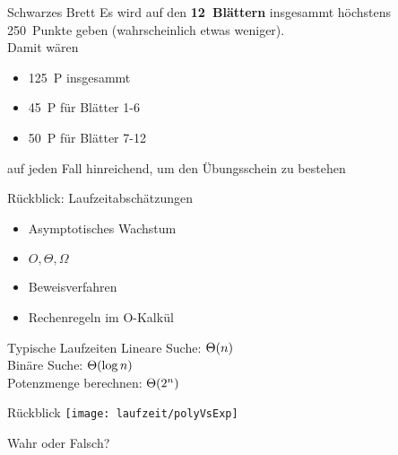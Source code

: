 {
	\begin{frame}{Schwarzes Brett}
     Es wird auf den \textbf{12~Blättern} insgesammt höchstens 250~Punkte geben (wahrscheinlich etwas weniger). \\
     Damit wären
		\begin{itemize}
            \item 125~P insgesammt
            \item 45~P für Blätter 1-6
            \item 50~P für Blätter 7-12
		\end{itemize}
    auf jeden Fall hinreichend, um den Übungsschein zu bestehen
	\end{frame}
}


\framePrevEpisode

\begin{frame}{Rückblick: Laufzeitabschätzungen}
	\begin{itemize}[<+->]
		\item Asymptotisches Wachstum
		\item $O, \Theta, \Omega$
		\item Beweisverfahren
		\item Rechenregeln im O-Kalkül
	\end{itemize}

	\pause
	\begin{block}{Typische Laufzeiten}
		Lineare Suche: $\Theta\!\left(n\right)$ \\
		Binäre Suche:  $\Theta\!\left(\log n\right)$ \\
		Potenzmenge berechnen: $\Theta\!\left(2^n\right)$
	\end{block}
\end{frame}

\begin{frame}{Rückblick}
	\centering
	\texttt{[image: laufzeit/polyVsExp]}
\end{frame}

\begin{frame}[t]{Wahr oder Falsch?}
\end{frame}


